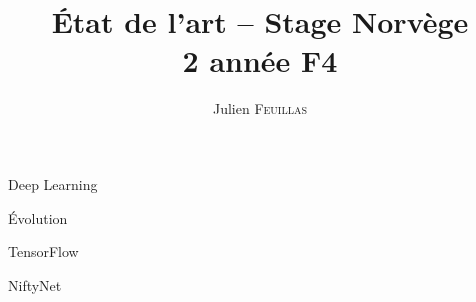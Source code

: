 \documentclass{book}
\title{\'Etat de l'art -- Stage Norvège\\2\up{ème} année F4}
\author{Julien \textsc{Feuillas}}
\begin{document}
  \pagedegarde

  \thispagestyle{empty}
	\pagestyle{plain}

	\cleardoublepage
	\renewcommand{\cleardoublepage}{\clearpage}

  \begin{chapter}{Deep Learning}

    \begin{section}{\'Evolution}

    \end{section}

  \end{chapter}

  \begin{chapter}{TensorFlow}

  \end{chapter}

  \begin{chapter}{NiftyNet}

  \end{chapter}

  \nocite{*}
  
  
\end{document}
